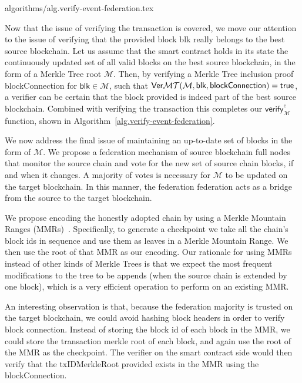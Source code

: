{algorithms/alg.verify-event-federation.tex}

Now that the issue of verifying the transaction is covered, we move our attention to the issue of verifying that the provided block \textsf{blk} really belongs to the best source blockchain. Let us assume that the smart contract holds in its state the continuously updated set of all valid blocks on the best source blockchain, in the form of a Merkle Tree root $\mathcal{M}$. Then, by verifying a Merkle Tree inclusion proof \textsf{blockConnection} for $\textsf{blk} \in \mathcal{M}$, such that $\mathsf{Ver}\mathcal{MT}(\mathcal{M}, \textsf{blk}, \textsf{blockConnection}) = \mathsf{true}$, a verifier can be certain that the block provided is indeed part of the best source blockchain. Combined with verifying the transaction this completes our $\textsf{verify}_\mathcal{M}^e$ function, shown in Algorithm~\ref{alg.verify-event-federation}.

We now address the final issue of maintaining an up-to-date set of blocks in the form of $\mathcal{M}$. We propose a federation mechanism of source blockchain full nodes that monitor the source chain and vote for the new set of source chain blocks, if and when it changes. A majority of votes is necessary for $\mathcal{M}$ to be updated on the target blockchain. In this manner, the federation federation acts as a bridge from the source to the target blockchain.

We propose encoding the honestly adopted chain by using a Merkle Mountain Ranges (MMRs)~\cite{flyclient}. Specifically, to generate a checkpoint we take all the chain's block ids in sequence and use them as leaves in a Merkle Mountain Range. We then use the root of that MMR as our encoding. Our rationale for using MMRs instead of other kinds of Merkle Trees is that we expect the most frequent modifications to the tree to be appends (when the source chain is extended by one block), which is a very efficient operation to perform on an existing MMR.

An interesting observation is that, because the federation majority is trusted on the target blockchain, we could avoid hashing block headers in order to verify block connection. Instead of storing the block id of each block in the MMR, we could store the transaction merkle root of each block, and again use the root of the MMR as the checkpoint. The verifier on the smart contract side would then verify that the \textsf{txIDMerkleRoot} provided exists in the MMR using the \textsf{blockConnection}.

